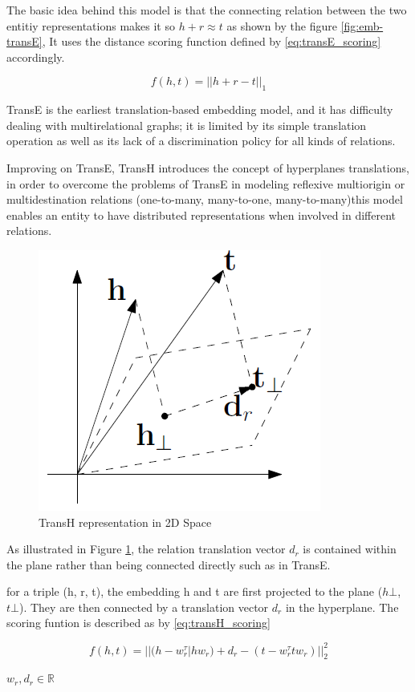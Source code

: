 The basic idea behind this model is that the connecting relation between the two entitiy representations makes it so  $h + r \approx t$ as shown by the figure \ref{fig:emb-transE}, It uses the distance scoring function defined by \ref{eq:transE_scoring} accordingly.

\begin{equation}
    \label{eq:transE_scoring}
    f (h, t) = ||h + r - t||_1
\end{equation}
    
TransE is the earliest translation-based embedding model, and it has difficulty dealing with multirelational graphs; it is limited by its simple translation operation as well as its lack of a discrimination policy for all kinds of relations.

Improving on TransE, TransH introduces the concept of hyperplanes translations, in order to overcome the problems of TransE in modeling reflexive multiorigin or multidestination relations (one-to-many, many-to-one, many-to-many)this model enables an entity to have distributed representations when involved in different relations. 

\begin{figure}[!htp]
    \centering
    \includegraphics[width=.4\textwidth]{fig/embeddings/TransH.png}
    \caption{TransH representation in 2D Space}
    \label{fig:emb-transH}
\end{figure}

As illustrated in Figure \ref{fig:emb-transH}, the relation translation vector $d_r$ is contained within the plane rather than being connected directly such as in TransE.

for a triple (h, r, t), the embedding h and t are first projected to the plane ($h\bot$, $t\bot$). They are then connected by a translation vector $d_r$ in the hyperplane. The scoring funtion is described as by \ref{eq:transH_scoring}

\begin{equation}
    \label{eq:transH_scoring}
    f (h, t) = || (h - w^\tau_r |hw_r) + d_r - (t-w^\tau_r tw_r) ||^2_2
\end{equation}
\begin{center}
    $w_r, d_r \in \mathbb{R}$
\end{center}

